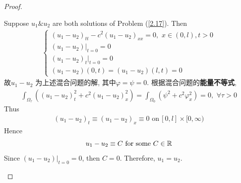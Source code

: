 \begin{thm}
\begin{proof}
\begin{itemize}
				\newpage
				
				Suppose $u_1 \& u_2$ are both solutions of Problem (\ref{2.17}). Then 
				\begin{align*}
					\begin{cases}
						(u_1 - u_2)_{tt} - c^2 (u_1 - u_2)_{xx} = 0 , \,\, x \in (0 , l) , t > 0 \\
						(u_1 - u_2) \Big|_{t = 0} = 0 \\
						(u_1 - u_2)_t \Big|_{t = 0} = 0 \\
						(u_1 - u_2)(0 , t) = (u_1 - u_2)(l , t) = 0
					\end{cases}
				\end{align*}
				故$u_1 - u_2$ 为上述混合问题的解, 其中$\varphi = \psi = 0$. 根据混合问题的\textbf{能量不等式}, 
				\begin{align*}
					\int_{\Omega_\tau} ((u_1 - u_2)_{t}^2 + c^2 (u_1 - u_2)_{x}^2) = \int_{\Omega_0} (\psi^2 + c^2 \varphi_{x}^2) = 0 , \,\, \forall \tau > 0
				\end{align*}
				Thus
				\begin{align*}
					(u_1 - u_2)_t \equiv (u_1 - u_2)_x \equiv 0 \,\, \text{on} \, [0 , l] \times [0 , \infty)
				\end{align*}
				Hence
				\[ u_1 - u_2 \equiv C \,\, \text{for some} \,\, C \in \mathbb{R} \]
				Since $(u_1 - u_2) \Big|_{t = 0} = 0$, then $C = 0$. Therefore, $u_1 = u_2$. 
			\end{itemize}
		\end{proof}
	\end{thm}



	\ifx\allfiles\undefined

\fi